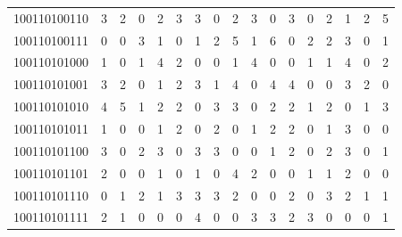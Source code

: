 \documentclass[10pt,a4paper]{article}
\begin{document}
\begin{longtable}{ |c|c|c|c|c|c|c|c|c|c|c|c|c|c|c|c|c| }
    100110100110              & 3                            & 2                                & 0                            & 2                              & 3   & 3   & 0   & 2   & 3   & 0   & 3   & 0   & 2   & 1   & 2   & 5   \\
    100110100111              & 0                            & 0                                & 3                            & 1                              & 0   & 1   & 2   & 5   & 1   & 6   & 0   & 2   & 2   & 3   & 0   & 1   \\
    100110101000              & 1                            & 0                                & 1                            & 4                              & 2   & 0   & 0   & 1   & 4   & 0   & 0   & 1   & 1   & 4   & 0   & 2   \\
    100110101001              & 3                            & 2                                & 0                            & 1                              & 2   & 3   & 1   & 4   & 0   & 4   & 4   & 0   & 0   & 3   & 2   & 0   \\
    100110101010              & 4                            & 5                                & 1                            & 2                              & 2   & 0   & 3   & 3   & 0   & 2   & 2   & 1   & 2   & 0   & 1   & 3   \\
    100110101011              & 1                            & 0                                & 0                            & 1                              & 2   & 0   & 2   & 0   & 1   & 2   & 2   & 0   & 1   & 3   & 0   & 0   \\
    100110101100              & 3                            & 0                                & 2                            & 3                              & 0   & 3   & 3   & 0   & 0   & 1   & 2   & 0   & 2   & 3   & 0   & 1   \\
    100110101101              & 2                            & 0                                & 0                            & 1                              & 0   & 1   & 0   & 4   & 2   & 0   & 0   & 1   & 1   & 2   & 0   & 0   \\
    100110101110              & 0                            & 1                                & 2                            & 1                              & 3   & 3   & 3   & 2   & 0   & 0   & 2   & 0   & 3   & 2   & 1   & 1   \\
    100110101111              & 2                            & 1                                & 0                            & 0                              & 0   & 4   & 0   & 0   & 3   & 3   & 2   & 3   & 0   & 0   & 0   & 1   \\

\end{longtable}
\end{document}
